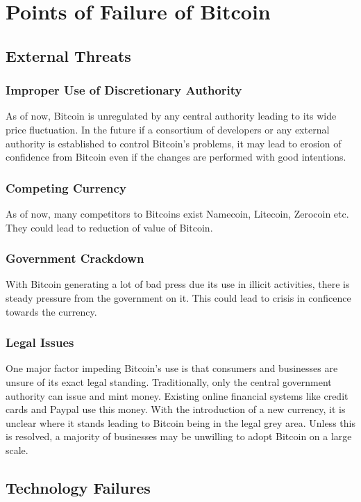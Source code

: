 \section{Points of Failure of Bitcoin}
\subsection{External Threats}

\subsubsection{Improper Use of Discretionary Authority}
As of now, Bitcoin is unregulated by any central authority leading to its wide price fluctuation. In the future if a consortium of developers or any external authority is established to control Bitcoin’s problems, it may lead to erosion of confidence from Bitcoin even if the changes are performed with good intentions.

\subsubsection{Competing Currency}
As of now, many competitors to Bitcoins exist Namecoin, Litecoin, Zerocoin etc. They could lead to reduction of value of Bitcoin.

\subsubsection{Government Crackdown}
With Bitcoin generating a lot of bad press due its use in illicit activities, there is steady pressure from the government on it. This could lead to  crisis in conficence towards the currency.

\subsubsection{Legal Issues}
One major factor impeding Bitcoin’s use is that consumers and businesses are unsure of its exact legal standing. Traditionally, only the central government authority can issue and mint money. Existing online financial systems like credit cards and Paypal use this money. With the introduction of a new currency, it is unclear where it stands leading to Bitcoin being in the legal grey area. Unless this is resolved, a majority of businesses may be unwilling to adopt Bitcoin on a large scale.

\subsection{Technology Failures}
